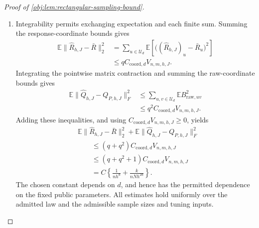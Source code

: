 \begin{proof}[Proof of \cref{obj:lem:rectangular-sampling-bound}]
\begin{enumerate}
\item Integrability permits exchanging expectation and each finite sum. Summing the response-coordinate bounds gives
\[
\begin{aligned}
\mathbb E\|\widehat R_{h,J}-\bar R\|_2^2
&=\sum_{u\in\mathcal U_d}
 \mathbb E\left[
   \bigl((\widehat R_{h,J})_u-\bar R_u\bigr)^2
 \right]\\
&\le qC_{\mathrm{coord},d}V_{n,m,h,J}.
\end{aligned}
\]
Integrating the pointwise matrix contraction and summing the raw-coordinate bounds gives
\[
\begin{aligned}
\mathbb E\|\widehat Q_{h,J}-Q_{P,h,J}\|_F^2
&\le\sum_{u,v\in\mathcal U_d}
 \mathbb E B_{\mathrm{raw},uv}^2\\
&\le q^2C_{\mathrm{coord},d}V_{n,m,h,J}.
\end{aligned}
\]
Adding these inequalities, and using
\(C_{\mathrm{coord},d}V_{n,m,h,J}\ge0\), yields
\[
\begin{aligned}
&\mathbb E\|\widehat R_{h,J}-\bar R\|_2^2
+\mathbb E\|\widehat Q_{h,J}-Q_{P,h,J}\|_F^2\\
&\qquad\le(q+q^2)C_{\mathrm{coord},d}V_{n,m,h,J}\\
&\qquad\le(q+q^2+1)C_{\mathrm{coord},d}V_{n,m,h,J}\\
&\qquad=C\left\{\frac1{nh^d}+\frac{k}{nNh^{2d}}\right\}.
\end{aligned}
\]
The chosen constant depends on \(d\), and hence has the permitted dependence on the fixed public parameters. All estimates hold uniformly over the admitted law and the admissible sample sizes and tuning inputs.
\end{enumerate}
\end{proof}
